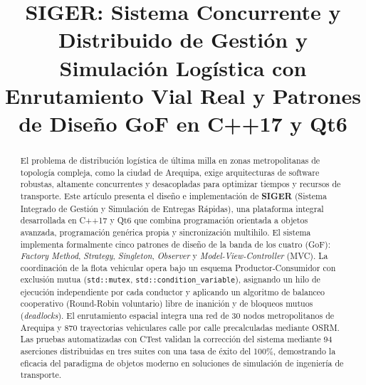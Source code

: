 \documentclass[conference]{IEEEtran}
\begin{document}
\title{SIGER: Sistema Concurrente y Distribuido de Gestión y Simulación Logística con Enrutamiento Vial Real y Patrones de Diseño GoF en C++17 y Qt6}

\author{
    \vspace{0.3em}
}

\maketitle

\begin{abstract}
El problema de distribución logística de última milla en zonas metropolitanas de topología compleja, como la ciudad de Arequipa, exige arquitecturas de software robustas, altamente concurrentes y desacopladas para optimizar tiempos y recursos de transporte. Este artículo presenta el diseño e implementación de \textbf{SIGER} (Sistema Integrado de Gestión y Simulación de Entregas Rápidas), una plataforma integral desarrollada en C++17 y Qt6 que combina programación orientada a objetos avanzada, programación genérica propia y sincronización multihilo. El sistema implementa formalmente cinco patrones de diseño de la banda de los cuatro (GoF): \textit{Factory Method}, \textit{Strategy}, \textit{Singleton}, \textit{Observer} y \textit{Model-View-Controller} (MVC). La coordinación de la flota vehicular opera bajo un esquema Productor-Consumidor con exclusión mutua (\texttt{std::mutex}, \texttt{std::condition\_variable}), asignando un hilo de ejecución independiente por cada conductor y aplicando un algoritmo de balanceo cooperativo (Round-Robin voluntario) libre de inanición y de bloqueos mutuos (\textit{deadlocks}). El enrutamiento espacial integra una red de 30 nodos metropolitanos de Arequipa y 870 trayectorias vehiculares calle por calle precalculadas mediante OSRM. Las pruebas automatizadas con CTest validan la corrección del sistema mediante 94 aserciones distribuidas en tres suites con una tasa de éxito del 100\%, demostrando la eficacia del paradigma de objetos moderno en soluciones de simulación de ingeniería de transporte.
\end{abstract}
\end{document}
